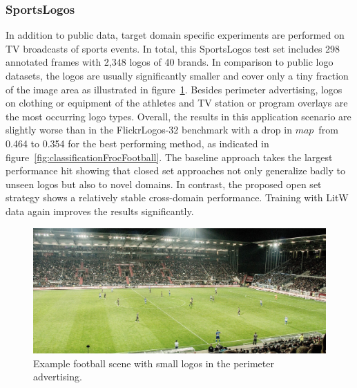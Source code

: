 \documentclass[a4paper,twoside]{article}
\newcommand{\map}{$\mathit{map}$}
\begin{document}
\subsubsection*{SportsLogos}
\vspace*{-2.5mm}
In addition to public data, target domain specific experiments are performed on TV broadcasts of sports events. In total, this SportsLogos test set includes 298 annotated frames with 2,348 logos of 40 brands. In comparison to public logo datasets, the logos are usually significantly smaller and cover only a tiny fraction of the image area as illustrated in figure~\ref{fig:footballSample}. Besides perimeter advertising, logos on clothing or equipment of the athletes and TV station or program overlays are the most occurring logo types.
Overall, the results in this application scenario are slightly worse than in the FlickrLogos-32 benchmark with a drop in \map~from 0.464 to 0.354 for the best performing method, as indicated in figure~\ref{fig:classificationFrocFootball}. The baseline approach takes the largest performance hit showing that closed set approaches not only generalize badly to unseen logos but also to novel domains. In contrast, the proposed open set strategy shows a relatively stable cross-domain performance. Training with \ac{LitW} data again improves the results significantly.
%
\begin{figure}%
\centering%
\includegraphics[width=\linewidth]{img/football-1908719_1920_cut.jpg}%
\caption{Example football scene with small logos in the perimeter advertising.}%
\label{fig:footballSample}
\end{figure}%
\end{document}
